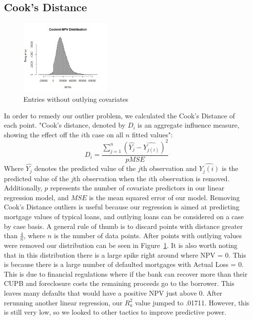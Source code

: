 \documentclass[12 pt]{uncw_thesis}
\theoremstyle{plain}
\theoremstyle{remark}
\theoremstyle{definition}
\begin{document}
\subsection{Cook's Distance}

\begin{figure}
	\vspace{-\normalbaselineskip}
	\centering
	\includegraphics[width=0.4\textwidth]{images/Cooked.jpeg}
	\caption{Entries without outlying covariates}
	\label{fig:Cooks}
	\vspace{-\normalbaselineskip}
\end{figure}
In order to remedy our outlier problem, we calculated the Cook's Distance of each point. "Cook's distance, denoted by $D_i$ is an aggregate influence measure, showing the effect off the $i$th case on all $n$ fitted values":
\[D_i = \frac{\sum_{j=1}^n(\hat{Y_j}-\hat{Y_{j(i)}})^2}{pMSE}\]
Where $\hat{Y_j}$ denotes the predicted value of the $j$th observation and $\hat{Y_j(i)}$ is the predicted value of the $j$th observation when the $i$th observation is removed. Additionally, $p$ represents the number of covariate predictors in our linear regression model, and $MSE$ is the mean squared error of our model\cite{512}.
Removing Cook's Distance outliers is useful because our regression is aimed at predicting mortgage values of typical loans, and outlying loans can be considered on a case by case basis. A general rule of thumb is to discard points with distance greater than \(\frac{4}{n}\), where \(n\) is the number of data points\cite{Cook's Rule}. After points with outlying values were removed our distribution can be seen in Figure~\ref{fig:Cooks}. It is also worth noting that in this distribution there is a large spike right around where NPV = 0. This is because there is a large number of  defaulted mortgages with Actual Loss = 0. This is due to financial regulations where if the bank can recover more than their CUPB and foreclosure costs the remaining proceeds go to the borrower. This leaves many defaults that would have a positive NPV just above 0. After rerunning another linear regression, our \(R^2_a\) value jumped to .01711. However, this is still very low, so we looked to other tactics to improve predictive power.
\end{document}
